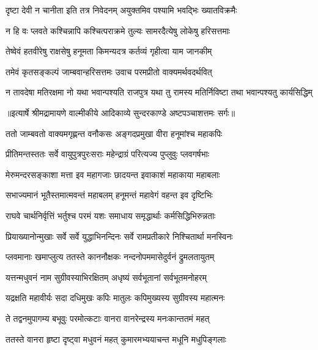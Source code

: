 \twolineshloka
{दृष्टा देवी न चानीता इति तत्र निवेदनम्}
{अयुक्तमिव पश्यामि भवद्भिः ख्यातविक्रमैः} %

\twolineshloka
{न हि वः प्लवते कश्चिन्नापि कश्चित्पराक्रमे}
{तुल्यः सामरदैत्येषु लोकेषु हरिसत्तमाः} %

\twolineshloka
{तेष्वेवं हतवीरेषु राक्षसेषु हनूमता}
{किमन्यदत्र कर्तव्यं गृहीत्वा याम जानकीम्} %

\twolineshloka
{तमेवं कृतसङ्कल्पं जाम्बवान्हरिसत्तमः}
{उवाच परमप्रीतो वाक्यमर्थवदर्थवित्} %

\fourlineindentedshloka
{न तावदेषा मतिरक्षमा नो}
{यथा भवान्पश्यति राजपुत्र}
{यथा तु रामस्य मतिर्निविष्टा}
{तथा भवान्पश्यतु कार्यसिद्धिम्} %


{॥इत्यार्षे श्रीमद्रामायणे वाल्मीकीये आदिकाव्ये सुन्दरकाण्डे अष्टपञ्चाशत्तमः सर्गः॥}


\twolineshloka
{ततो जाम्बवतो वाक्यमगृह्णन्त वनौकसः}
{अङ्गदप्रमुखा वीरा हनूमांश्च महाकपिः} %

\twolineshloka
{प्रीतिमन्तस्ततः सर्वे वायुपुत्रपुरःसराः}
{महेन्द्राग्रं परित्यज्य पुप्लुवुः प्लवगर्षभाः} %

\twolineshloka
{मेरुमन्दरसङ्काशा मत्ता इव महागजाः}
{छादयन्त इवाकाशं महाकाया महाबलाः} %

\twolineshloka
{सभाज्यमानं भूतैस्तमात्मवन्तं महाबलम्}
{हनूमन्तं महावेगं वहन्त इव दृष्टिभिः} %

\twolineshloka
{राघवे चार्थनिर्वृत्तिं भर्तुश्च परमं यशः}
{समाधाय समृद्धार्थाः कर्मसिद्धिभिरुन्नताः} %

\twolineshloka
{प्रियाख्यानोन्मुखाः सर्वे सर्वे युद्धाभिनन्दिनः}
{सर्वे रामप्रतीकारे निश्चितार्था मनस्विनः} %

\twolineshloka
{प्लवमानाः खमाप्लुत्य ततस्ते काननौक्षकः}
{नन्दनोपममासेदुर्वनं द्रुमलतायुतम्} %

\twolineshloka
{यत्तन्मधुवनं नाम सुग्रीवस्याभिरक्षितम्}
{अधृष्यं सर्वभूतानां सर्वभूतमनोहरम्} %

\twolineshloka
{यद्रक्षति महावीर्यः सदा दधिमुखः कपिः}
{मातुलः कपिमुख्यस्य सुग्रीवस्य महात्मनः} %

\twolineshloka
{ते तद्वनमुपागम्य बभूवुः परमोत्कटाः}
{वानरा वानरेन्द्रस्य मनःकान्ततमं महत्} %

\twolineshloka
{ततस्ते वानरा हृष्टा दृष्ट्वा मधुवनं महत्}
{कुमारमभ्ययाचन्त मधूनि मधुपिङ्गलाः} %

